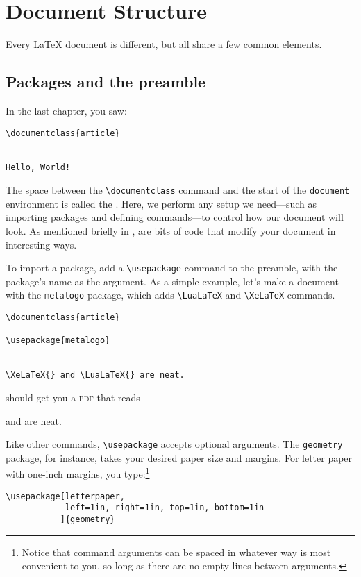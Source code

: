 \chapter{Document Structure}
\label{structure}

Every \LaTeX{} document is different,
but all share a few common elements.

\section{Packages and the preamble}
In the last chapter, you saw:
\begin{leftfigure}
\begin{lstlisting}
\documentclass{article}


Hello, World!

\end{lstlisting}
\end{leftfigure}
The space between the \verb|\documentclass| command and the start of the
\texttt{document} environment is called the .
Here, we perform any setup we need---such as importing packages
and defining commands---to control how our document
will look.
As mentioned briefly in ,
 are bits of code that modify your document
in interesting ways.

To import a package, add a \verb|\usepackage| command to the preamble,
with the package's name as the argument.
As a simple example, let's make a document with the \texttt{metalogo}
package, which adds \verb|\LuaLaTeX| and \verb|\XeLaTeX| commands.
\begin{leftfigure}
\begin{lstlisting}
\documentclass{article}

\usepackage{metalogo}


\XeLaTeX{} and \LuaLaTeX{} are neat.

\end{lstlisting}
\end{leftfigure}
\begin{samepage}
should get you a \textsc{pdf} that reads
\begin{leftfigure}
\lm \XeLaTeX{} and \LuaLaTeX{} are neat.
\end{leftfigure}
\end{samepage}
Like other commands, \verb|\usepackage| accepts optional arguments.
The \texttt{geometry} package, for instance,
takes your desired paper size and margins.
For  letter paper with one-inch margins, you type:\footnote{Notice
that command arguments can be spaced in whatever way is most convenient to you,
so long as there are no empty lines between arguments.}
\begin{leftfigure}
\begin{lstlisting}
\usepackage[letterpaper,
            left=1in, right=1in, top=1in, bottom=1in
           ]{geometry}
\end{lstlisting}
\end{leftfigure}


